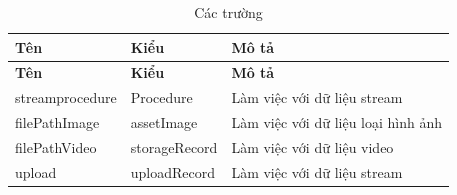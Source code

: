 \begin{center}
\begin{longtabu} to 
\caption{Các trường} \\
   \hline \textbf{Tên}  & \textbf{Kiểu} & \textbf{Mô tả}  \\ \hline
   \endfirsthead
   \hline \textbf{Tên}  & \textbf{Kiểu} & \textbf{Mô tả}  \\ \hline
   \endhead
      streamprocedure & Procedure  & Làm việc với dữ liệu stream
      \\ \hline
      filePathImage & assetImage  & Làm việc với dữ liệu loại hình ảnh
      \\ \hline
      filePathVideo & storageRecord  & Làm việc với dữ liệu video
      \\ \hline
      upload & uploadRecord  & Làm việc với dữ liệu stream
      \\ \hline
\end{longtabu}
\end{center}


